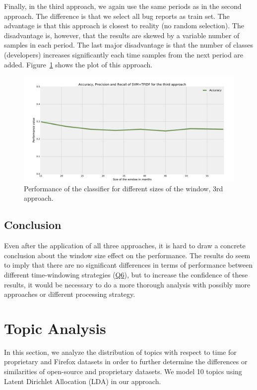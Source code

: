 Finally, in the third approach, we again use the same periods as in the second approach. The difference is that we select all bug reports as train set. The advantage is that this approach is closest to reality (no random selection). The disadvantage is, however, that the results are skewed by a variable number of samples in each period. The last major disadvantage is that the number of classes (developers) increases significantly each time samples from the next period are added. Figure~\ref{fig:window.firefox.3a} shows the plot of this approach.

\begin{figure}[htbp]
    \centering
        \includegraphics[width=\textwidth]{./images/window_size/firefox_3a.pdf}
    \caption{Performance of the classifier for different sizes of the window, 3rd approach.}
    \label{fig:window.firefox.3a}
\end{figure}

\subsection{Conclusion}

Even after the application of all three approaches, it is hard to draw a concrete conclusion about the window size effect on the performance. The results do seem to imply that there are no significant differences in terms of performance between different time-windowing strategies (\hyperlink{question:6}{Q6}), but to increase the confidence of these results, it would be necessary to do a more thorough analysis with possibly more approaches or different processing strategy.

\section{Topic Analysis}

In this section, we analyze the distribution of topics with respect to time for proprietary and Firefox datasets in order to further determine the differences or similarities of open-source and proprietary datasets. We model 10 topics using Latent Dirichlet Allocation (LDA) in our approach.

